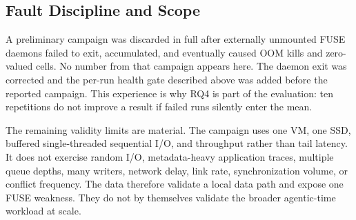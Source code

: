 \subsection{Fault Discipline and Scope}
\label{subsec:eval-validity}

A preliminary campaign was discarded in full after externally unmounted FUSE
daemons failed to exit, accumulated, and eventually caused OOM kills and
zero-valued cells.  No number from that campaign appears here.  The daemon exit
was corrected and the per-run health gate described above was added before the
reported campaign.  This experience is why RQ4 is part of the evaluation: ten
repetitions do not improve a result if failed runs silently enter the mean.

The remaining validity limits are material.  The campaign uses one VM, one
SSD, buffered single-threaded sequential I/O, and throughput rather than tail
latency.  It does not exercise random I/O, metadata-heavy application traces,
multiple queue depths, many writers, network delay, link rate,
synchronization volume, or conflict frequency.  The data therefore validate a
local data path and expose one FUSE weakness.  They do not by themselves
validate the broader agentic-time workload at scale.
